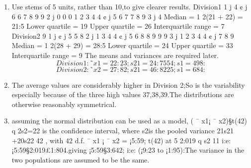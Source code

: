 \documentclass[a4paper,12pt]{article}
\begin{document}
\begin{enumerate}
    \item  Use stems of 5 units, rather than 10,to give clearer results.
Division1
1 j 4
¢ j 6 6 7 8 9 9
2 j 0 0 0 1 2 3 4 4
¢ j 5 6 7 7 8 9
3 j 4
Median = 1
2(21 + 22) = 21:5
Lower quartile = 19
Upper quartile = 26
Interquartile range = 7
Division2
9
1 j
¢ j 5 5 8
2 j 1 3 4 4
¢ j 5 6 8 8 9 9 9
3 j 1 2 3 4 4
¢ j 7 8 9
Median = 1
2(28 + 29) = 28:5
Lower quartile = 24
Upper quartile = 33
Interquartile range = 9
The means and variances are required later.
\[Division1 : ˜ x1 = 22:23; s21
= 24:7554; s1 = 498:\]
\[Division2 : ˜ x2 = 27:82; s21
= 46:8225; s1 = 684:\]
\item The average values are considerably higher in Division 2;So is the variability
especially because of the three high values 37,38,39.The distributions are otherwise reasonably
symmetrical.
\item assuming the normal distribution can be used as a model, ( ¯ x1¡ ¯ x2)§t(42)
q
2s2=22
is the confidence interval, where s2is the pooled variance 21s21
+20s22
42 , with 42 d.f. ¯ x1 ¡
¯ x2 = ¡5:59; t(42) at 5%
2:019
q
s2
11 i:e: ¡5:59§2:019£1:804.giving ¡5:59§3:642; i:e: (¡9:23 to ¡1:95):The
variance in the two populations are assumed to be the same.
\end{enumerate}
\end{document}
